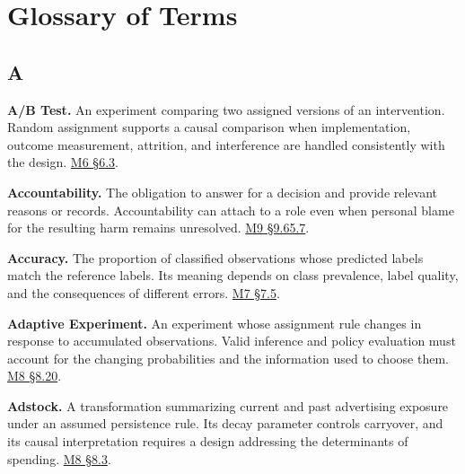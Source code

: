 \clearpage
\begingroup
\setlength{\parindent}{0pt}
\hypertarget{module-glossary-of-terms}{%
\chapter*{Glossary of Terms}\label{module-glossary-of-terms}}

\par{}
\hypertarget{module-a}{%
\section*{A}\label{module-a}}

\noindent\textbf{A/B Test.} An experiment comparing two assigned versions of an
intervention. Random assignment supports a causal comparison when
implementation, outcome measurement, attrition, and interference are
handled consistently with the design.
\href{Marketing_Analytics_Lecture_Notes.pdf\#M06-designing-an-experiment-around-the-decision}{M6
§6.3}.

\noindent\textbf{Accountability.} The obligation to answer for a decision and
provide relevant reasons or records. Accountability can attach to a role
even when personal blame for the resulting harm remains unresolved.
\hyperref[M09-responsibility-for-the-artifact-and-its-uses]{M9
§9.65.7}.

\noindent\textbf{Accuracy.} The proportion of classified observations whose
predicted labels match the reference labels. Its meaning depends on
class prevalence, label quality, and the consequences of different
errors.
\href{Marketing_Analytics_Lecture_Notes.pdf\#M07-case-study-accuracy-can-conceal-a-useless-model}{M7
§7.5}.

\noindent\textbf{Adaptive Experiment.} An experiment whose assignment rule
changes in response to accumulated observations. Valid inference and
policy evaluation must account for the changing probabilities and the
information used to choose them.
\href{Marketing_Analytics_Lecture_Notes.pdf\#M08-ai-experimentation-and-personalized-pricing}{M8
§8.20}.

\noindent\textbf{Adstock.} A transformation summarizing current and past
advertising exposure under an assumed persistence rule. Its decay
parameter controls carryover, and its causal interpretation requires a
design addressing the determinants of spending.
\href{Marketing_Analytics_Lecture_Notes.pdf\#M08-marketing-mix-models-combine-carryover-and-saturation}{M8
§8.3}.

